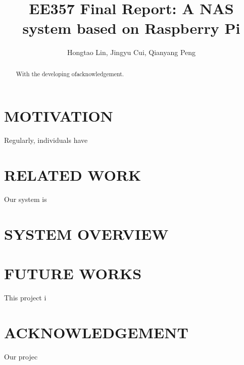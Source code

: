 \documentclass[12pt]{article}
\title{EE357 Final Report: A NAS system based on Raspberry Pi}
\author{Hongtao Lin, Jingyu Cui, Qianyang Peng}
\date{}
\begin{document}
\maketitle
\tableofcontents
\newpage
{}

\begin{abstract}
	With the developing ofacknowledgement.
\end{abstract}

\section{MOTIVATION}
	Regularly, individuals have 

\section{RELATED WORK}
Our system is 

\section{SYSTEM OVERVIEW}
    

\section{FUTURE WORKS}

This project i

\section{ACKNOWLEDGEMENT}

Our projec
\end{document}
